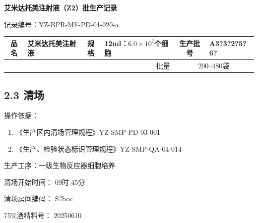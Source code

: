 \documentclass[UTF8,10pt,a4paper,fontset=fandol]{ctexart}
\newcommand{\fieldvalue}[1]{#1}
\newcommand{\handwritten}[1]{#1}
\begin{document}
\newpage

\begin{center}
\textbf{艾米达托美注射液（Z2）批生产记录}
\end{center}

记录编号：YZ-BPR-MF-PD-01-020-a

\begin{tabularx}{\textwidth}{|c|X|c|X|c|X|}
\hline
品名 & 艾米达托美注射液 & 规格 & 12ml：$6.0\times10^7$个细胞 & 生产批号 &
\fieldvalue{\handwritten{A3?3?2?5?6?}} \\
\hline
\multicolumn{4}{|r|}{批量} & \multicolumn{2}{c|}{200--480袋} \\
\hline
\end{tabularx}

\subsection*{2.3 清场}

操作依据：

\begin{enumerate}
\item 《生产区内清场管理规程》\hfill YZ-SMP-PD-03-001
\item 《生产、检验状态标识管理规程》\hfill YZ-SMP-QA-04-014
\end{enumerate}

生产工序：一级生物反应器细胞培养

清场开始时间：
\fieldvalue{\handwritten{09}}时
\fieldvalue{\handwritten{45}}分

清场房间编码：
\fieldvalue{\handwritten{S?boc}}

\hfill 75\%酒精料号：
\fieldvalue{\handwritten{20250610}}
\end{document}

